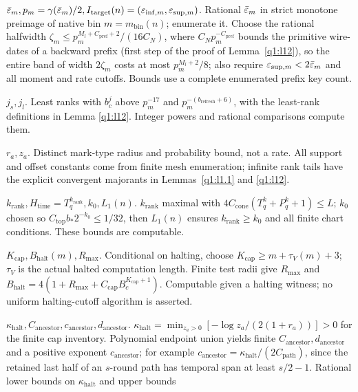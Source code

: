 \noindent\textbf{\(\bar{\varepsilon}_{m},p_{m}=\gamma(\bar{\varepsilon}_{m})/2,I_{\mathrm{target}}(n)=(\varepsilon_{\mathrm{inf},m},\varepsilon_{\mathrm{sup},m})\)}. Rational \(\bar{\varepsilon}_{m}\) in strict monotone preimage of native bin \(m=m_{\mathrm{bin}}(n)\); enumerate it. Choose the rational halfwidth \(\zeta_{m}\le p_{m}^{M_{l}+C_{\mathrm{pref}}+2}/(16 C_{N})\), where \(C_{N}p_{m}^{-C_{\mathrm{pref}}}\) bounds the primitive wire-dates of a backward prefix (first step of the proof of Lemma~\ref{q1:l12}), so the entire band of width \(2\zeta_{m}\) costs at most \(p_{m}^{M_{l}+2}/8\); also require \(\varepsilon_{\mathrm{sup},m}<2\bar{\varepsilon}_{m}\) and all moment and rate cutoffs. Bounds use a complete enumerated prefix key count.\par\smallskip
\noindent\textbf{\(j_{s},j_{l}\)}. Least ranks with \(b_{c}^{j}\) above \(p_{m}^{-17}\) and \(p_{m}^{-(b_{\mathrm{refresh}}+6)}\), with the least-rank definitions in Lemma \ref{q1:l12}. Integer powers and rational comparisons compute them.\par\smallskip
\noindent\textbf{\(r_{a},z_{a}\)}. Distinct mark-type radius and probability bound, not a rate. All support and offset constants come from finite mesh enumeration; infinite rank tails have the explicit convergent majorants in Lemmas~\ref{q1:l1.1} and \ref{q1:l12}.\par\smallskip
\noindent\textbf{\(k_{\mathrm{rank}},H_{\mathrm{time}}=T_{q}^{k_{\mathrm{rank}}},k_{0},L_{1}(n)\)}. \(k_{\mathrm{rank}}\) maximal with \(4C_{\mathrm{cone}}(T_{q}^{k}+P_{q}^{k}+1)\le L\); \(k_{0}\) chosen so \(C_{\mathrm{top}} b_{*} 2^{-k_{0}}\le 1/32\), then \(L_{1}(n)\) ensures \(k_{\mathrm{rank}}\ge k_{0}\) and all finite chart conditions. These bounds are computable.\par\smallskip
\noindent\textbf{\(K_{\mathrm{cap}},B_{\mathrm{halt}}(m),R_{\mathrm{max}}\)}. Conditional on halting, choose \(K_{\mathrm{cap}}\ge m+\tau_{V}(m)+3\); \(\tau_{V}\) is the actual halted computation length. Finite test radii give \(R_{\mathrm{max}}\) and \(B_{\mathrm{halt}}=4(1+R_{\mathrm{max}}+C_{\mathrm{cap}} B_{c}^{K_{\mathrm{cap}}+1})\). Computable given a halting witness; no uniform halting-cutoff algorithm is asserted.\par\smallskip
\noindent\textbf{\(\kappa_{\mathrm{halt}},C_{\mathrm{ancestor}},c_{\mathrm{ancestor}},d_{\mathrm{ancestor}}\)}. \(\kappa_{\mathrm{halt}}=\min _{z_{a}>0}[-\log  z_{a}/(2(1+r_{a}))]>0\) for the finite cap inventory. Polynomial endpoint union yields finite \(C_{\mathrm{ancestor}},d_{\mathrm{ancestor}}\) and a positive exponent \(c_{\mathrm{ancestor}}\); for example \(c_{\mathrm{ancestor}}=\kappa_{\mathrm{halt}}/(2C_{\mathrm{path}})\), since the retained last half of an \(s\)-round path has temporal span at least \(s/2-1\). Rational lower bounds on \(\kappa_{\mathrm{halt}}\) and upper bounds
